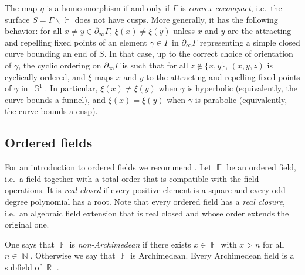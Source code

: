 \documentclass{amsart}
\theoremstyle{plain}
\theoremstyle{definition}
\DeclareMathOperator{\Fb}{{\mathbb{F}}}
\DeclareMathOperator{\Hb}{\mathbb{H}}
\DeclareMathOperator{\Nb}{{\mathbb{N}}}
\DeclareMathOperator{\Rb}{{\mathbb{R}}}
\DeclareMathOperator{\Sb}{\mathbb{S}}
\newcommand{\1}{\mathbf{1}}
\begin{document}
The map $\eta$ is a homeomorphism if and only if $\Gamma$ is \emph{convex cocompact}, i.e.\ the surface $S = \Gamma \backslash \Hb$ does not have cusps. More generally, it has the following behavior: for all $x\neq y \in \partial_\infty \Gamma$, $\xi(x) \neq \xi(y)$ unless $x$ and $y$ are the attracting and repelling fixed points of an element $\gamma \in \Gamma$ in $\partial_\infty \Gamma$ representing a simple closed curve bounding an end of $S$. In that case, up to the correct choice of orientation of $\gamma$, the cyclic ordering on $\partial_\infty \Gamma$ is such that for all $z\notin \{x,y\}$, $(x,y,z)$ is cyclically ordered, and $\xi$ maps $x$ and $y$ to the attracting and repelling fixed points of $\gamma$ in~$\Sb^1$. In particular, $\xi(x) \neq \xi(y)$ when $\gamma$ is hyperbolic (equivalently, the curve bounds a funnel), and $\xi(x) = \xi(y)$ when $\gamma$ is parabolic (equivalently, the curve bounds a cusp).


\subsection{Ordered fields}\label{sec: ordered fields}

For an introduction to ordered fields we recommend \cite[Chapter 1]{Scheiderer_RAG}.
Let $\Fb$ be an ordered field, i.e.\ a field together with a total order that is compatible with the field operations. It is \emph{real closed} if every positive element is a square and every odd degree polynomial has a root. Note that every ordered field has a \emph{real closure}, i.e.\ an algebraic field extension that is real closed and whose order extends the original one.

One says that $\Fb$ is \emph{non-Archimedean} if there exists $x \in \Fb$ with $x>n$ for all $n\in \Nb$. Otherwise we say that $\Fb$ is Archimedean. Every Archimedean field is a subfield of $\Rb$ \cite[1.1.18 Theorem]{Scheiderer_RAG}.
\end{document}
